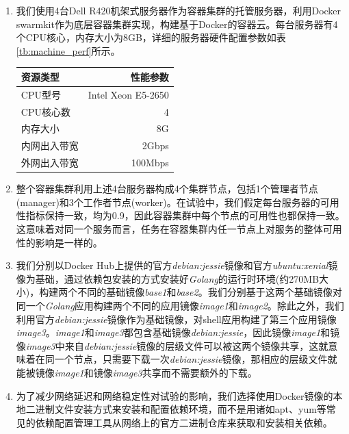 \begin{enumerate}
\item 我们使用4台Dell R420机架式服务器作为容器集群的托管服务器，利用Docker swarmkit作为底层容器集群实现，构建基于Docker的容器云。每台服务器有4个CPU核心，内存大小为8GB，详细的服务器硬件配置参数如表\ref{tb:machine_perf}所示。

\begin{table}[h]
\centering
{}
\begin{tabular}{@{}lr@{}} \toprule
 资源类型 & 性能参数 \\ \midrule
 CPU型号 & Intel Xeon E5-2650\\
 CPU核心数 & 4\\
 内存大小 & 8G\\
 内网出入带宽 & 2Gbps\\
 外网出入带宽 & 100Mbps\\ \bottomrule
\end{tabular}
\end{table}

\item 整个容器集群利用上述4台服务器构成4个集群节点，包括1个管理者节点(manager)和3个工作者节点(worker)。在试验中，我们假定每台服务器的可用性指标保持一致，均为0.9，因此容器集群中每个节点的可用性也都保持一致。这意味着对同一个服务而言，任务在容器集群内任一节点上对服务的整体可用性的影响是一样的。

\item\label{req:serv_image} 我们分别以Docker Hub上提供的官方\emph{debian:jessie}镜像和官方\emph{ubuntu:xenial}镜像为基础，通过依赖包安装的方式安装好\emph{Golang}的运行时环境(约270MB大小)，构建两个不同的基础镜像\emph{base1}和\emph{base2}。我们分别基于这两个基础镜像对同一个\emph{Golang}应用构建两个不同的应用镜像\emph{image1}和\emph{image2}。除此之外，我们利用官方\emph{debian:jessie}镜像作为基础镜像，对shell应用构建了第三个应用镜像\emph{image3}。\emph{image1}和\emph{image3}都包含基础镜像\emph{debian:jessie}，因此镜像\emph{image1}和镜像\emph{image3}中来自\emph{debian:jessie}镜像的层级文件可以被这两个镜像共享，这就意味着在同一个节点，只需要下载一次\emph{debian:jessie}镜像，那相应的层级文件就能被镜像\emph{image1}和镜像\emph{image3}共享而不需要额外的下载。

\item 为了减少网络延迟和网络稳定性对试验的影响，我们选择使用Docker镜像的本地二进制文件安装方式来安装和配置依赖环境，而不是用诸如apt、yum等常见的依赖配置管理工具从网络上的官方二进制仓库来获取和安装相关依赖。


\end{enumerate}
